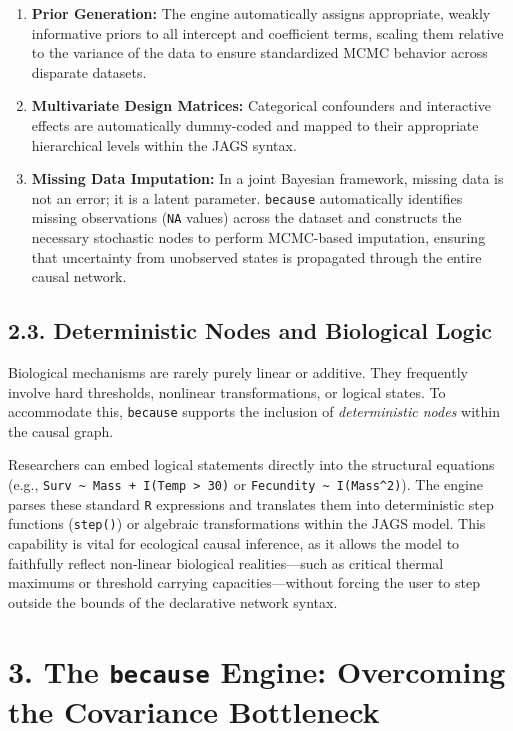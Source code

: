 \documentclass[
]{article}
\providecommand{\tightlist}{%
  \setlength{\itemsep}{0pt}\setlength{\parskip}{0pt}}
\begin{document}
\begin{enumerate}
\def\labelenumi{\arabic{enumi}.}
\tightlist
\item
  \textbf{Prior Generation:} The engine automatically assigns appropriate, weakly informative priors to all intercept and coefficient terms, scaling them relative to the variance of the data to ensure standardized MCMC behavior across disparate datasets.
\item
  \textbf{Multivariate Design Matrices:} Categorical confounders and interactive effects are automatically dummy-coded and mapped to their appropriate hierarchical levels within the JAGS syntax.
\item
  \textbf{Missing Data Imputation:} In a joint Bayesian framework, missing data is not an error; it is a latent parameter. \texttt{because} automatically identifies missing observations (\texttt{NA} values) across the dataset and constructs the necessary stochastic nodes to perform MCMC-based imputation, ensuring that uncertainty from unobserved states is propagated through the entire causal network.
\end{enumerate}

\subsection{2.3. Deterministic Nodes and Biological Logic}\label{deterministic-nodes-and-biological-logic}

Biological mechanisms are rarely purely linear or additive. They frequently involve hard thresholds, nonlinear transformations, or logical states. To accommodate this, \texttt{because} supports the inclusion of \emph{deterministic nodes} within the causal graph.

Researchers can embed logical statements directly into the structural equations (e.g., \texttt{Surv\ \textasciitilde{}\ Mass\ +\ I(Temp\ \textgreater{}\ 30)} or \texttt{Fecundity\ \textasciitilde{}\ I(Mass\^{}2)}). The engine parses these standard \texttt{R} expressions and translates them into deterministic step functions (\texttt{step()}) or algebraic transformations within the JAGS model. This capability is vital for ecological causal inference, as it allows the model to faithfully reflect non-linear biological realities---such as critical thermal maximums or threshold carrying capacities---without forcing the user to step outside the bounds of the declarative network syntax.

\section{\texorpdfstring{3. The \texttt{because} Engine: Overcoming the Covariance Bottleneck}{3. The because Engine: Overcoming the Covariance Bottleneck}}\label{the-because-engine-overcoming-the-covariance-bottleneck}
\end{document}
